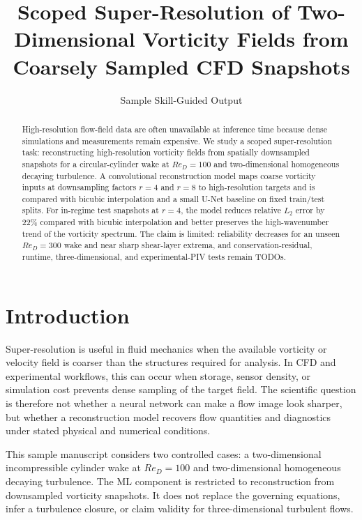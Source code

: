 \documentclass[11pt]{article}
\title{Scoped Super-Resolution of Two-Dimensional Vorticity Fields from Coarsely Sampled CFD Snapshots}
\author{Sample Skill-Guided Output}
\date{}
\begin{document}
\maketitle

\begin{abstract}
High-resolution flow-field data are often unavailable at inference time because dense simulations and measurements remain expensive. We study a scoped super-resolution task: reconstructing high-resolution vorticity fields from spatially downsampled snapshots for a circular-cylinder wake at $Re_D=100$ and two-dimensional homogeneous decaying turbulence. A convolutional reconstruction model maps coarse vorticity inputs at downsampling factors $r=4$ and $r=8$ to high-resolution targets and is compared with bicubic interpolation and a small U-Net baseline on fixed train/test splits. For in-regime test snapshots at $r=4$, the model reduces relative $L_2$ error by 22\% compared with bicubic interpolation and better preserves the high-wavenumber trend of the vorticity spectrum. The claim is limited: reliability decreases for an unseen $Re_D=300$ wake and near sharp shear-layer extrema, and conservation-residual, runtime, three-dimensional, and experimental-PIV tests remain TODOs.
\end{abstract}

\section{Introduction}
Super-resolution is useful in fluid mechanics when the available vorticity or velocity field is coarser than the structures required for analysis. In CFD and experimental workflows, this can occur when storage, sensor density, or simulation cost prevents dense sampling of the target field. The scientific question is therefore not whether a neural network can make a flow image look sharper, but whether a reconstruction model recovers flow quantities and diagnostics under stated physical and numerical conditions.

This sample manuscript considers two controlled cases: a two-dimensional incompressible cylinder wake at $Re_D=100$ and two-dimensional homogeneous decaying turbulence. The ML component is restricted to reconstruction from downsampled vorticity snapshots. It does not replace the governing equations, infer a turbulence closure, or claim validity for three-dimensional turbulent flows.
\end{document}
